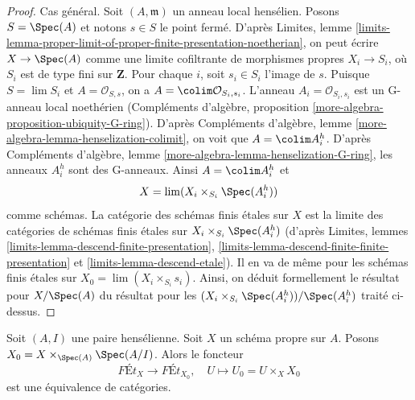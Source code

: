 \begin{proof}
\medskip\noindent
Cas général. Soit $(A, \mathfrak m)$ un anneau local hensélien.
Posons $S = \Spec(A)$ et notons $s \in S$ le point fermé. D'après Limites, lemme
\ref{limits-lemma-proper-limit-of-proper-finite-presentation-noetherian},
on peut écrire $X \to \Spec(A)$ comme une limite cofiltrante de
morphismes propres $X_i \to S_i$, où $S_i$ est de type fini sur $\mathbf{Z}$.
Pour chaque $i$, soit $s_i \in S_i$ l'image de $s$.
Puisque $S = \lim S_i$ et $A = \mathcal{O}_{S, s}$, on a
$A = \colim \mathcal{O}_{S_i, s_i}$. L'anneau $A_i = \mathcal{O}_{S_i, s_i}$
est un G-anneau local noethérien (Compléments d'algèbre, proposition
\ref{more-algebra-proposition-ubiquity-G-ring}).
D'après Compléments d'algèbre, lemme \ref{more-algebra-lemma-henselization-colimit},
on voit que $A = \colim A_i^h$. D'après
Compléments d'algèbre, lemme \ref{more-algebra-lemma-henselization-G-ring},
les anneaux $A_i^h$ sont des G-anneaux. Ainsi $A = \colim A_i^h$ et
$$
X = \lim (X_i \times_{S_i} \Spec(A_i^h))
$$
comme schémas. La catégorie des schémas finis étales sur $X$ est la limite
des catégories de schémas finis étales sur
$X_i \times_{S_i} \Spec(A_i^h)$ (d'après
Limites, lemmes
\ref{limits-lemma-descend-finite-presentation},
\ref{limits-lemma-descend-finite-finite-presentation} et
\ref{limits-lemma-descend-etale}).
Il en va de même pour les schémas finis étales sur
$X_0 = \lim (X_i \times_{S_i} s_i)$.
Ainsi, on déduit formellement le résultat pour $X / \Spec(A)$
du résultat pour les $(X_i \times_{S_i} \Spec(A_i^h)) / \Spec(A_i^h)$
traité ci-dessus.
\end{proof}

\begin{lemma}
\label{lemma-finite-etale-on-proper-over-henselian-pair}
Soit $(A, I)$ une paire hensélienne. Soit $X$ un schéma propre sur $A$.
Posons $X_0 = X \times_{\Spec(A)} \Spec(A/I)$. Alors le foncteur
$$
\textit{F\'Et}_X \to \textit{F\'Et}_{X_0},\quad
U \longmapsto U_0 = U \times_X X_0
$$
est une équivalence de catégories.
\end{lemma}

